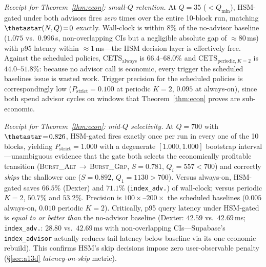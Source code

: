 \emph{Receipt for Theorem~\ref{thm:econ}: small-$Q$ retention.}
At $Q\!=\!35$ ($<\!Q_{\min}$), HSM-gated under both advisors fires
\emph{zero} times over the entire 10-block run, matching
$\thetastar(N,Q)\!=\!0$ exactly.  Wall-clock is within $8\%$ of the
no-advisor baseline ($1.075$ vs.\ $0.996$\,s, non-overlapping CIs but
a negligible absolute gap of $\approx\!80$\,ms) with p95 latency
within $\approx\!1$\,ms---the HSM decision layer is effectively free.
Against the scheduled policies, $\text{CETS}_{\mathrm{always}}$ is
$66.4$--$68.0\%$ and $\text{CETS}_{\mathrm{periodic},K=2}$ is
$44.0$--$51.8\%$: because no advisor call is economic, every trigger
the scheduled baselines issue is wasted work.  Trigger precision for
the scheduled policies is correspondingly low ($P_{\mathrm{strict}}
\!=\!0.100$ at periodic $K\!=\!2$, $0.095$ at always-on), since both
spend advisor cycles on windows that Theorem~\ref{thm:econ} proves
are sub-economic.

\emph{Receipt for Theorem~\ref{thm:econ}: mid-$Q$ selectivity.}
At $Q\!=\!700$ with $\thetastar\!=\!0.826$, HSM-gated fires exactly
once per run in every one of the 10 blocks, yielding
$P_{\mathrm{strict}}\!=\!1.000$ with a degenerate $[1.000,1.000]$
bootstrap interval---unambiguous evidence that the gate both selects
the economically profitable transition
(\textsc{Burst\_Alt}\,$\to$\,\textsc{Burst\_Grp}, $S\!=\!0.781$,
$Q_i\!=\!557\!<\!700$) and correctly \emph{skips} the shallower one
($S\!=\!0.892$, $Q_1\!=\!1130\!>\!700$).  Versus always-on, HSM-gated
saves $66.5\%$ (Dexter) and $71.1\%$ (\texttt{index\_adv.}) of
wall-clock; versus periodic $K\!=\!2$, $50.7\%$ and $53.2\%$.
Precision is $100\times$--$200\times$ the scheduled baselines
($0.005$ always-on, $0.010$ periodic $K\!=\!2$).  Critically, p95
query latency under HSM-gated is \emph{equal to or better than} the
no-advisor baseline (Dexter: $42.59$ vs.\ $42.69$\,ms;
\texttt{index\_adv.}: $28.80$ vs.\ $42.69$\,ms with
non-overlapping CIs---Supabase's \texttt{index\_advisor} actually
reduces tail latency below baseline via its one economic rebuild).
This confirms HSM's skip decisions impose zero user-observable
penalty (\S\ref{sec:a13d} \emph{latency-on-skip} metric).

